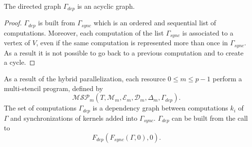 \begin{myprop}
The directed graph $\Gamma_{dep}$ is an acyclic graph.
\end{myprop}

\begin{proof}
$\Gamma_{dep}$ is built from $\Gamma_{sync}$ which is an ordered and sequential list of computations. Moreover, each computation of the list $\Gamma_{sync}$ is associated to a vertex of $V$, even if the same computation is represented more than once in $\Gamma_{sync}$. As a result it is not possible to go back to a previous computation and to create a cycle.
\end{proof}

As a result of the hybrid parallelization, each resource $0 \leq m \leq p-1$ perform a multi-stencil program, defined by
\begin{equation*}
\mathcal{MSP}_m(T,\mathcal{M}_m,\mathcal{E}_m,\mathcal{D}_m,\Delta_m,\Gamma_{dep}).
\end{equation*}
The set of computations $\Gamma_{dep}$ is a dependency graph between computations $k_i$ of $\Gamma$ and synchronizations of kernels added into $\Gamma_{sync}$. $\Gamma_{dep}$ can be built from the call to 
\begin{equation*}
F_{dep}(F_{sync}(\Gamma,0),0).
\end{equation*}

